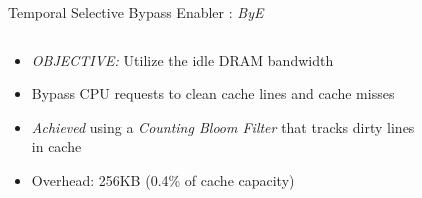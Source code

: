 \documentclass[final,t]{beamer}
\newcommand*\circled[1]{\tikz[baseline=(char.base)]{
            \node[shape=circle,draw,inner sep=2pt] (char) {#1};}}
\begin{document}
\begin{frame}[t,fragile]{}
\begin{columns}[t]
\begin{column}{.48\linewidth}
\begin{tcolorbox}
    \begin{exampleblock}{\circled{2} Temporal Selective Bypass Enabler : \textit{ByE}}
    	\begin{columns} [T]
    		\begin{column}{0.6\linewidth}
    	    \begin{itemize}
    	    	\item \emph{OBJECTIVE:} Utilize the idle DRAM bandwidth
    	    	\item Bypass CPU requests to clean cache lines and cache misses
    	    	\item \emph{Achieved} using a \textit{Counting Bloom Filter} that tracks dirty lines in cache
    	    	\item Overhead: 256KB (0.4\% of cache capacity)
    	    \end{itemize}     			
    		\end{column}
    		\begin{column}{0.4\linewidth}
    			\begin{figure}
					\centering
            		\def\svgwidth{0.9\linewidth}
            		
    			\end{figure}
    	    \end{column}
    	\end{columns}
	\end{exampleblock} 
    \vspace{0.8em}


\end{tcolorbox}
\end{column}
\end{columns}
\end{frame}
\end{document}
